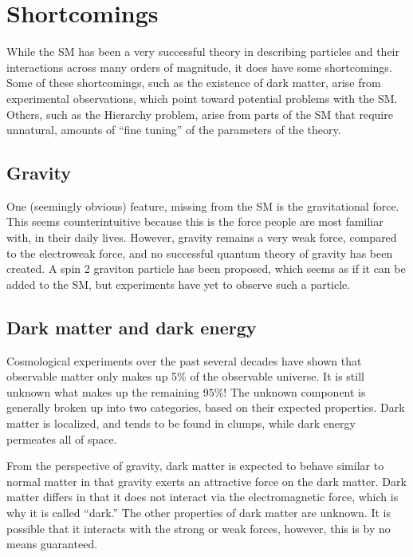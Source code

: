 \FloatBarrier
\section{Shortcomings}
\label{sec:sm_shortcomings}

While the SM has been a very successful theory in describing particles
and their interactions across many orders of magnitude, it does have some
shortcomings.
Some of these shortcomings, such as the existence of dark matter, arise from
experimental observations, which point toward potential problems with the SM.
Others, such as the Hierarchy problem, arise from parts of the SM that require
unnatural, amounts of ``fine tuning'' of the parameters of the theory.

\FloatBarrier
\subsection{Gravity}

One (seemingly obvious) feature, missing from the SM is the gravitational
force.
This seems counterintuitive because this is the force people are most
familiar with, in their daily lives.
However, gravity remains a very weak force, compared to the electroweak force,
and no successful quantum theory of gravity has been created.
A spin 2 graviton particle has been proposed, which seems as if it can be added
to the SM, but experiments have yet to observe such a particle.

\FloatBarrier
\subsection{Dark matter and dark energy}

Cosmological experiments over the past several
decades\cite{Clowe:2006eq,Ade:2013zuv} have shown that observable matter
only makes up 5\% of the observable universe.
It is still unknown what makes up the remaining 95\%!
The unknown component is generally broken up into two categories, based on
their expected properties.
Dark matter is localized, and tends to be found in clumps, while dark energy
permeates all of space.

From the perspective of gravity, dark matter is expected to behave similar to
normal matter in that gravity exerts an attractive force on the dark matter.
Dark matter differs in that it does not interact via the electromagnetic force,
which is why it is called ``dark.''
The other properties of dark matter are unknown.
It is possible that it interacts with the strong or weak forces, however, this
is by no means guaranteed.


